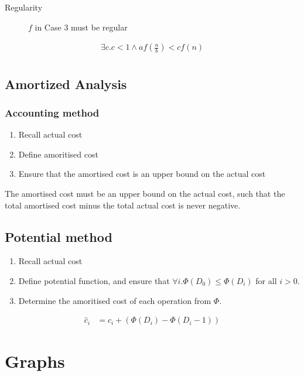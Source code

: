 \documentclass[landscape]{cheat}
\begin{document}
\begin{multicols*}{3}
\begin{description}
    \item[Regularity] $f$ in Case 3 must be regular
\end{description}
\begin{align*}
    \exists c. c < 1 \land af\left(\frac n b\right) < cf(n)\\
\end{align*}

\subsection{Amortized Analysis}
\subsubsection{Accounting method}
\begin{enumerate}
    \item Recall actual cost
    \item Define amoritised cost
    \item Ensure that the amortised cost is an upper bound on the actual cost
\end{enumerate}

The amortised cost must be an upper bound on the actual cost, such that the total amortised cost minus the total actual cost is never negative.

\subsection{Potential method}

\begin{enumerate}
    \item Recall actual cost
    \item Define potential function, and ensure that $\forall i. \Phi(D_0) \leq \Phi(D_i)$ for all $i > 0$.
    \item Determine the amoritised cost of each operation from $\Phi$.
\end{enumerate}

\begin{align*}
    \hat{c}_i &= c_i + (\Phi(D_i) - \Phi(D_i - 1))
\end{align*}

\section{Graphs}


\end{multicols*}
\end{document}
